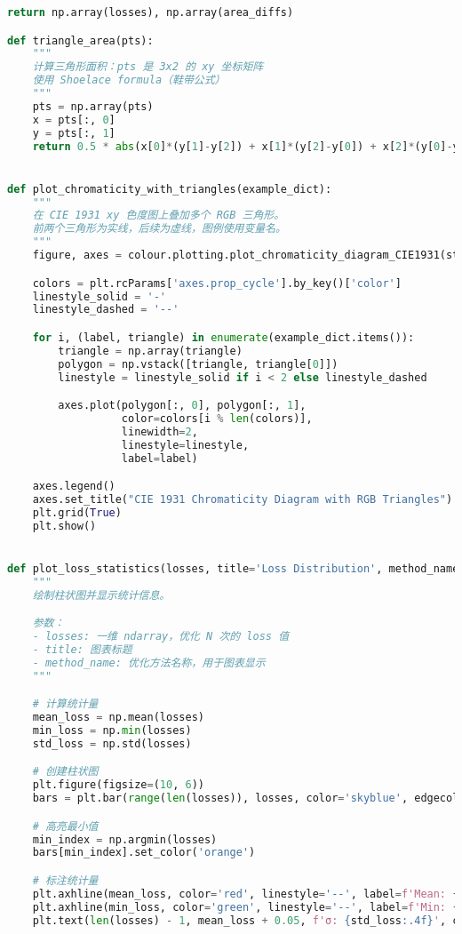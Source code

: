 \begin{lstlisting}[language=Python]
    return np.array(losses), np.array(area_diffs)

def triangle_area(pts):
    """
    计算三角形面积：pts 是 3x2 的 xy 坐标矩阵
    使用 Shoelace formula（鞋带公式）
    """
    pts = np.array(pts)
    x = pts[:, 0]
    y = pts[:, 1]
    return 0.5 * abs(x[0]*(y[1]-y[2]) + x[1]*(y[2]-y[0]) + x[2]*(y[0]-y[1]))


def plot_chromaticity_with_triangles(example_dict):
    """
    在 CIE 1931 xy 色度图上叠加多个 RGB 三角形。
    前两个三角形为实线，后续为虚线，图例使用变量名。
    """
    figure, axes = colour.plotting.plot_chromaticity_diagram_CIE1931(standalone=False)

    colors = plt.rcParams['axes.prop_cycle'].by_key()['color']
    linestyle_solid = '-'
    linestyle_dashed = '--'

    for i, (label, triangle) in enumerate(example_dict.items()):
        triangle = np.array(triangle)
        polygon = np.vstack([triangle, triangle[0]])
        linestyle = linestyle_solid if i < 2 else linestyle_dashed

        axes.plot(polygon[:, 0], polygon[:, 1],
                  color=colors[i % len(colors)],
                  linewidth=2,
                  linestyle=linestyle,
                  label=label)

    axes.legend()
    axes.set_title("CIE 1931 Chromaticity Diagram with RGB Triangles")
    plt.grid(True)
    plt.show()


def plot_loss_statistics(losses, title='Loss Distribution', method_name='L-BFGS-B'):
    """
    绘制柱状图并显示统计信息。

    参数：
    - losses: 一维 ndarray，优化 N 次的 loss 值
    - title: 图表标题
    - method_name: 优化方法名称，用于图表显示
    """

    # 计算统计量
    mean_loss = np.mean(losses)
    min_loss = np.min(losses)
    std_loss = np.std(losses)

    # 创建柱状图
    plt.figure(figsize=(10, 6))
    bars = plt.bar(range(len(losses)), losses, color='skyblue', edgecolor='black')

    # 高亮最小值
    min_index = np.argmin(losses)
    bars[min_index].set_color('orange')

    # 标注统计量
    plt.axhline(mean_loss, color='red', linestyle='--', label=f'Mean: {mean_loss:.4f}')
    plt.axhline(min_loss, color='green', linestyle='--', label=f'Min: {min_loss:.4f}')
    plt.text(len(losses) - 1, mean_loss + 0.05, f'σ: {std_loss:.4f}', color='red', fontsize=10, ha='right')


\end{lstlisting}
